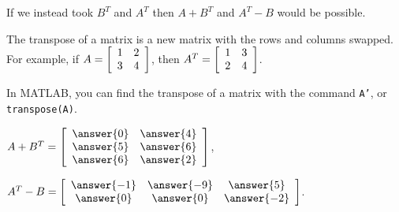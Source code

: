 \documentclass{ximera}
\begin{document}
\begin{problem}
\begin{enumerate}
        \begin{problem}
        If we instead took $B^T$ and $A^T$ then $A+B^T$ and $A^T-B$ would be possible.

        \begin{hint}
        
          The transpose of a matrix is a new matrix with the rows and columns swapped. For example, if $A = \startmat{cc} 1 & 2 \\ 3 & 4 \stopmat$, then $A^T = \startmat{cc} 1 & 3 \\ 2 & 4 \stopmat$.

          In MATLAB, you can find the transpose of a matrix with the command \texttt{A'}, or \texttt{transpose(A)}.
        \end{hint}
  
        $A+B^T = \startmat{cc}
          \answer{0} & \answer{4}  \\
          \answer{5} & \answer{6}  \\
          \answer{6} & \answer{2} 
        \stopmat$,\quad

        $A^T-B = \startmat{ccc}
          \answer{-1} & \answer{-9} & \answer{5} \\
          \answer{0} & \answer{0} & \answer{-2}
        \stopmat$.

        \end{problem}

  \end{enumerate}
\end{problem}
\end{document}

